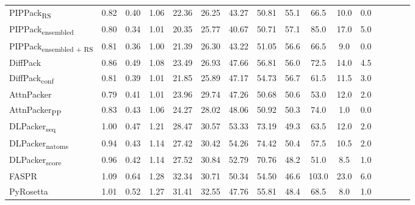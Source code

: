 \begin{table}
{\begin{tabular}{@{}lccccccccccccccc@{}}
                \textnormal{\hspace{0.5cm}PIPPack\textsubscript{RS}} & 0.82 & 0.40 & 1.06 & 22.36 & 26.25 & 43.27 & 50.81 & 55.1 & 66.5 & 10.0 & 0.0 \\
                \textnormal{\hspace{0.5cm}PIPPack\textsubscript{ensembled}} & 0.80 & 0.34 & 1.01 & 20.35 & 25.77 & 40.67 & 50.71 & 57.1 & 85.0 & 17.0 & 5.0 \\
                \textnormal{\hspace{0.5cm}PIPPack\textsubscript{ensembled + RS}} & 0.81 & 0.36 & 1.00 & 21.39 & 26.30 & 43.22 & 51.05 & 56.6 & 66.5 & 9.0 & 0.0 \\
                \textnormal{\hspace{0.5cm}DiffPack} & 0.86 & 0.49 & 1.08 & 23.49 & 26.93 & 47.66 & 56.81 & 56.0 & 72.5 & 14.0 & 4.5 \\
                \textnormal{\hspace{0.5cm}DiffPack\textsubscript{conf}} & 0.81 & 0.39 & 1.01 & 21.85 & 25.89 & 47.17 & 54.73 & 56.7 & 61.5 & 11.5 & 3.0 \\
                \textnormal{\hspace{0.5cm}AttnPacker} & 0.79 & 0.41 & 1.01 & 23.96 & 29.74 & 47.26 & 50.68 & 50.6 & 53.0 & 12.0 & 2.0 \\
                \textnormal{\hspace{0.5cm}AttnPacker\textsubscript{PP}} & 0.83 & 0.43 & 1.06 & 24.27 & 28.02 & 48.06 & 50.92 & 50.3 & 74.0 & 1.0 & 0.0 \\
                \textnormal{\hspace{0.5cm}DLPacker\textsubscript{seq}} & 1.00 & 0.47 & 1.21 & 28.47 & 30.57 & 53.33 & 73.19 & 49.3 & 63.5 & 12.0 & 2.0 \\
                \textnormal{\hspace{0.5cm}DLPacker\textsubscript{natoms}} & 0.94 & 0.43 & 1.14 & 27.42 & 30.42 & 54.26 & 74.42 & 50.4 & 57.5 & 10.5 & 2.0 \\
                \textnormal{\hspace{0.5cm}DLPacker\textsubscript{score}} & 0.96 & 0.42 & 1.14 & 27.52 & 30.84 & 52.79 & 70.76 & 48.2 & 51.0 & 8.5 & 1.0 \\
                \textnormal{\hspace{0.5cm}FASPR} & 1.09 & 0.64 & 1.28 & 32.34 & 30.71 & 50.34 & 54.50 & 46.6 & 103.0 & 23.0 & 6.0 \\
                \textnormal{\hspace{0.5cm}PyRosetta} & 1.01 & 0.52 & 1.27 & 31.41 & 32.55 & 47.76 & 55.81 & 48.4 & 68.5 & 8.0 & 1.0 \\

\end{tabular}}
\end{table}

